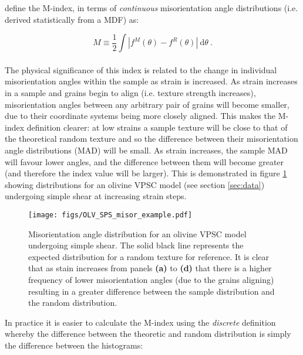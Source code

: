 \documentclass[a4paper,12pt]{report}
\numberwithin{equation}{chapter}
\begin{document}
\cite{Skemer} define the M-index, in terms of \emph{continuous} misorientation angle distributions (i.e. derived statistically from a MDF) as:

\begin{equation} \label{eq:Mindex_cont}
M \equiv \frac{1}{2} \int | f^M(\theta) - f^R(\theta) |\ \mathrm{d}\theta \ .
\end{equation}  
\\   
The physical significance of this index is related to the change in individual misorientation angles within the sample as strain is increased. As strain increases in a sample and grains begin to align (i.e. texture strength increases), misorientation angles between any arbitrary pair of grains will become smaller, due to their coordinate systems being more closely aligned. This makes the M-index definition clearer: at low strains a sample texture will be close to that of the theoretical random texture and so the difference between their misorientation angle distributions (MAD) will be small. As strain increases, the sample MAD will favour lower angles, and the difference between them will become greater (and therefore the index value will be larger). This is demonstrated in figure \ref{fig:misorientation_example} showing distributions for an olivine VPSC model (see section \ref{sec:data}) undergoing simple shear at increasing strain steps.


\begin{figure}[t]
  \centering
    \texttt{[image: figs/OLV\_SPS\_misor\_example.pdf]}
  \caption[Misorientation angle distribution example (olivine VPSC)]{Misorientation angle distribution for an olivine VPSC model undergoing simple shear. The solid black line represents the expected distribution for a random texture for reference. It is clear that as stain increases from panels \textbf{(a)} to \textbf{(d)} that there is a higher frequency of lower misorientation angles (due to the grains aligning) resulting in a greater difference between the sample distribution and the random distribution.}
  \label{fig:misorientation_example}
\end{figure}

In practice it is easier to calculate the M-index using the \emph{discrete} definition whereby the difference between the theoretic and random distribution is simply the difference between the histograms:
\end{document}
